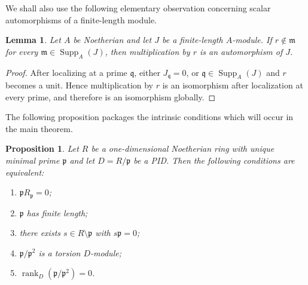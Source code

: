 \documentclass[11pt]{article}
\newtheorem{proposition}[theorem]{Proposition}
\newtheorem{lemma}[theorem]{Lemma}
\theoremstyle{definition}
\newcommand{\Supp}{\operatorname{Supp}}
\newcommand{\rank}{\operatorname{rank}}
\begin{document}
We shall also use the following elementary observation concerning scalar automorphisms of a
finite-length module.

\begin{lemma}\label{lem:scalar-auto}
Let $A$ be Noetherian and let $J$ be a finite-length $A$-module.  If
$r\notin\mathfrak m$ for every $\mathfrak m\in\Supp_A(J)$, then multiplication by $r$ is an
automorphism of $J$.
\end{lemma}

\begin{proof}
After localizing at a prime $\mathfrak q$, either $J_{\mathfrak q}=0$, or
$\mathfrak q\in\Supp_A(J)$ and $r$ becomes a unit.  Hence multiplication by $r$ is an
isomorphism after localization at every prime, and therefore is an isomorphism globally.
\end{proof}



The following proposition packages the intrinsic conditions which will occur in the main
theorem.

\begin{proposition}\label{prop:intrinsic-equivalences}
Let $R$ be a one-dimensional Noetherian ring with unique minimal prime $\mathfrak p$ and let
$D=R/\mathfrak p$ be a PID.  Then the following conditions are equivalent:
\begin{enumerate}[label=\textup{(\roman*)}]
\item $\mathfrak pR_{\mathfrak p}=0$;
\item $\mathfrak p$ has finite length;
\item there exists $s\in R\setminus\mathfrak p$ with $s\mathfrak p=0$;
\item $\mathfrak p/\mathfrak p^2$ is a torsion $D$-module;
\item $\rank_D(\mathfrak p/\mathfrak p^2)=0$.
\end{enumerate}
\end{proposition}
\end{document}
